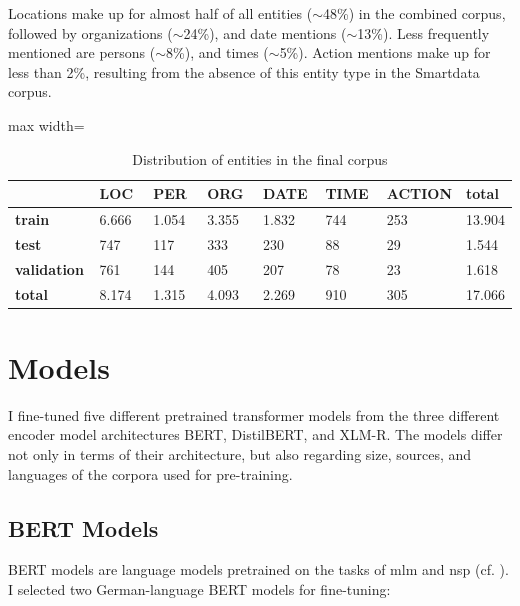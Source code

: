Locations make up for almost half of all entities ($\sim$48\%) in the combined corpus, followed by organizations ($\sim$24\%), and date mentions ($\sim$13\%). Less frequently mentioned are persons ($\sim$8\%), and times ($\sim$5\%). Action mentions make up for less than 2\%, resulting from the absence of this entity type in the Smartdata corpus. 

\begin{table}[ht]
\caption{Distribution of entities in the final corpus}
\label{tab:final_corpus_stats}
\centering
\begin{adjustbox}{max width=\textwidth}
\begin{tabular}{|p{0.18\linewidth}|p{0.15\linewidth}|p{0.15\linewidth}|p{0.15\linewidth}|p{0.15\linewidth}|p{0.15\linewidth}|p{0.15\linewidth}|p{0.15\linewidth}|}
\hline
& \textbf{LOC} & \textbf{PER} & \textbf{ORG} & \textbf{DATE} & \textbf{TIME} & \textbf{ACTION} & \textbf{total} \\ \hline 
\textbf{train} & 6.666 & 1.054 & 3.355 & 1.832 & 744 & 253 & 13.904 \\ \hline
\textbf{test} & 747 & 117 & 333 & 230 & 88 & 29 & 1.544 \\ \hline
\textbf{validation} & 761 & 144 & 405 & 207 & 78 & 23 & 1.618 \\ \hline
\textbf{total} & 8.174 & 1.315 & 4.093 & 2.269 & 910 & 305 & 17.066 \\ \hline
\end{tabular}
\end{adjustbox}
\end{table}

\section{Models}
I fine-tuned five different pretrained transformer models from the three different encoder model architectures BERT, DistilBERT, and XLM-R. The models differ not only in terms of their architecture, but also regarding size, sources, and languages of the corpora used for pre-training. 

\subsection{BERT Models}
BERT models are language models pretrained on the tasks of \gls{mlm} and \gls{nsp} (cf. \cite{devlin_2018}). I selected two German-language BERT models for fine-tuning: 

